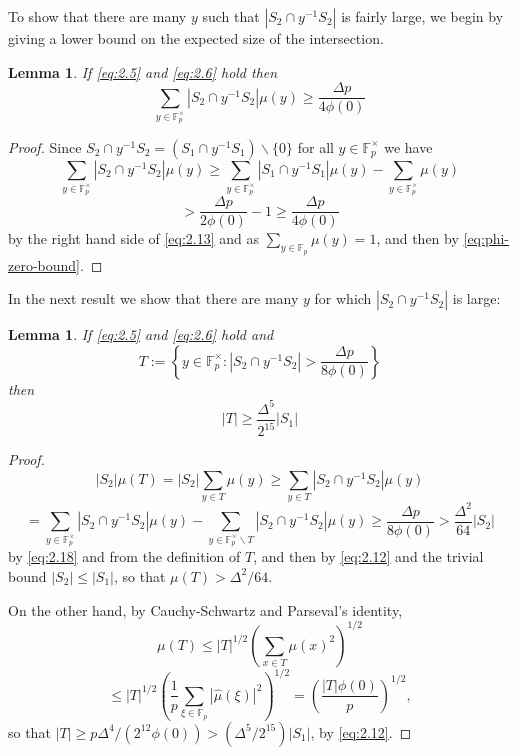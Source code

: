\documentclass[11pt]{amsart}
\newtheorem{lem}[thm]{Lemma}
\newcommand{\fp}{\mathbb{F}_p}
\newcommand{\muhat}{{\widehat{\mu}}}
\begin{document}
To show that there are many $y$ such that $|S_2 \cap y^{-1}S_2|$ is
fairly large, we begin by giving a lower bound on the expected size
of the intersection.

\begin{lem} If \eqref{eq:2.5} and \eqref{eq:2.6} hold then
\begin{equation}
  \label{eq:2.18}
\sum_{y \in \fp^\times} |S_2 \cap y^{-1}S_2| \mu(y) \geq
\frac{\Delta p}{4 \phi(0)}
\end{equation}
\end{lem}
\begin{proof} Since $S_2 \cap y^{-1}S_2 = (S_1 \cap y^{-1}S_1) \backslash \{ 0
\}$ for all $y \in \fp^\times$ we have
$$
\sum_{y \in \fp^\times} |S_2 \cap y^{-1}S_2| \mu(y) \geq \sum_{y \in
\fp^\times} |S_1 \cap y^{-1}S_1| \mu(y) - \sum_{y \in \fp^\times}
\mu(y)
$$
$$
> \frac{\Delta p}{2 \phi(0)} -
1\geq \frac{\Delta p}{4 \phi(0)}
$$
by the right hand side of \eqref{eq:2.13} and as $\sum_{y \in \fp}
\mu(y) = 1$, and then by \eqref{eq:phi-zero-bound}.

\end{proof}

In the next result we show that there are many $y$ for which $|S_2
\cap y^{-1}S_2|$ is large:

\begin{lem} If \eqref{eq:2.5} and \eqref{eq:2.6} hold and
\begin{equation}
\label{eq:2.19} T := \left\{ y \in \fp^\times : |S_2 \cap y^{-1}
S_2|
> \frac{\Delta p}{8 \phi(0)} \right\}
\end{equation}
then
\begin{equation}
\label{eq:2.20} |T| \geq \frac{\Delta^5}{2^{15}} |S_1|
\end{equation}
\end{lem}
\begin{proof}
$$
|S_2| \mu(T) = |S_2| \sum_{y \in T}\mu(y) \geq \sum_{y \in T} |S_2
\cap y^{-1} S_2| \mu(y)
$$
\begin{equation}
  \label{eq:2.21}
= \sum_{y \in \fp^\times} |S_2 \cap y^{-1} S_2| \mu(y) - \sum_{y \in
\fp^\times \backslash T} |S_2 \cap y^{-1} S_2| \mu(y) \geq
\frac{\Delta p}{8 \phi(0)} > \frac{\Delta^2}{64} |S_2|
\end{equation}
by \eqref{eq:2.18} and from the definition of $T$, and then by
\eqref{eq:2.12}  and the trivial bound $|S_2| \leq |S_1|$, so that
$\mu(T)>\Delta^2/64$.

On the other hand, by Cauchy-Schwartz and Parseval's identity,
$$
\mu(T) \leq |T|^{1/2} \left( \sum_{x \in T} \mu(x)^2 \right)^{1/2}
$$
$$
\leq |T|^{1/2} \left( \frac{1}{p} \sum_{\xi \in \fp} |\muhat(\xi)|^2
\right)^{1/2} = \left( \frac{|T| \phi(0)}{p} \right)^{1/2},
$$
so that $|T|  \geq p\Delta^4/(2^{12}\phi(0))
>(\Delta^5/2^{15})|S_1|$, by \eqref{eq:2.12}.
\end{proof}
\end{document}
